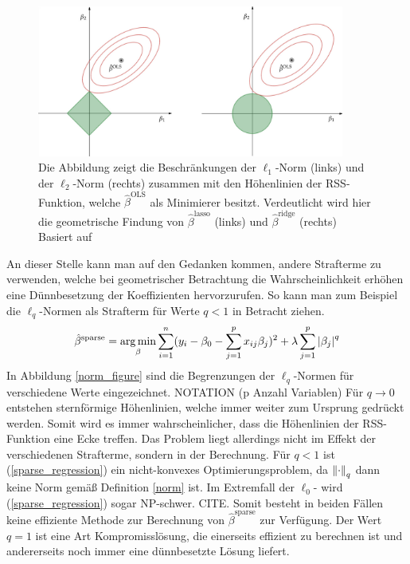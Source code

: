 \begin{figure}
\centering
\includegraphics[width = 0.9\textwidth]{figures/lasso_ridge_regression.jpg}
\caption{Die Abbildung zeigt die Beschränkungen der $\ell_1$-Norm (links) und der $\ell_2$-Norm (rechts) zusammen mit den Höhenlinien der RSS-Funktion, welche $\hat{\beta}^{\text{OLS}}$ als Minimierer besitzt. Verdeutlicht wird hier die geometrische Findung von $\hat{\beta}^{\text{lasso}}$ (links) und $\hat{\beta}^{\text{ridge}}$ (rechts)\\Basiert auf \cite{hastie_elements}}
\label{lasso_ridge_regression_figure}
\end{figure}

An dieser Stelle kann man auf den Gedanken kommen, andere Strafterme zu verwenden, welche bei geometrischer Betrachtung die Wahrscheinlichkeit erhöhen eine Dünnbesetzung der Koeffizienten hervorzurufen. So kann man zum Beispiel die $\ell_q$-Normen als Strafterm für Werte $q < 1$ in Betracht ziehen.
\begin{align}
\label{sparse_regression}
\hat{\beta}^{\text{sparse}} = \operatorname*{arg\,min}_{\beta} \sum_{i=1}^{n}(y_i - \beta_0 - \sum_{j=1}^p x_{ij}\beta_j)^2 + \lambda\sum_{j=1}^p \left|\beta_j\right|^q
\end{align}
In Abbildung \ref{norm_figure} sind die Begrenzungen der $\ell_q$-Normen für verschiedene Werte eingezeichnet. NOTATION (p Anzahl Variablen) Für $q \rightarrow 0$ entstehen sternförmige Höhenlinien, welche immer weiter zum Ursprung gedrückt werden. Somit wird es immer wahrscheinlicher, dass die Höhenlinien der RSS-Funktion eine Ecke treffen. Das Problem liegt allerdings nicht im Effekt der verschiedenen Strafterme, sondern in der Berechnung. Für $q < 1$ ist (\ref{sparse_regression}) ein nicht-konvexes Optimierungsproblem, da $\left\lVert \cdot \right\rVert_q$ dann keine Norm gemäß Definition \ref{norm} ist. Im Extremfall der $\ell_0$- wird (\ref{sparse_regression}) sogar NP-schwer. CITE. Somit besteht in beiden Fällen keine effiziente Methode zur Berechnung von $\hat{\beta}^{\text{sparse}}$ zur Verfügung. Der Wert $q = 1$ ist eine Art Kompromisslösung, die einerseits effizient zu berechnen ist und andererseits noch immer eine dünnbesetzte Lösung liefert.

